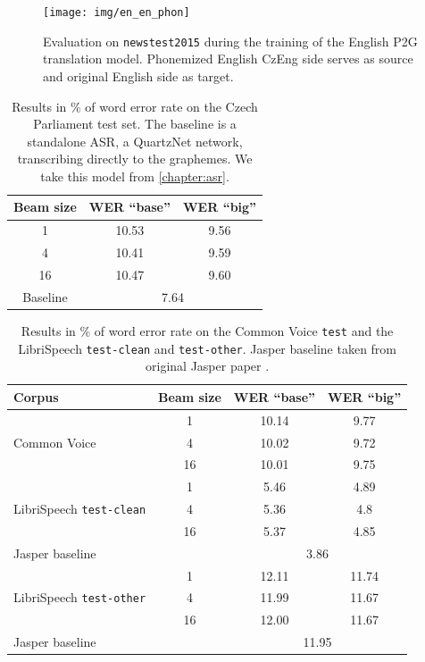 \begin{figure}[h]
	\texttt{[image: img/en\_en\_phon]}
	\caption{Evaluation on \texttt{newstest2015} during the training of the English P2G translation model. Phonemized English CzEng side serves as source and original English side as target.}
	\label{fig:en_en_phon}
\end{figure}




\begin{table}[h]
	\centering
	\begin{tabular}{c|cc}
		\bf Beam size & \bf WER ``base''& \bf WER ``big'' \\
		\hline
		1    &    10.53 & 9.56    \\
		4    &    10.41& 9.59    \\
		16    &    10.47& 9.60\\
		Baseline & \multicolumn{2}{c}{7.64} 
		
	\end{tabular}
	
	\caption{Results in \% of word error rate on the Czech Parliament test set. The baseline is a standalone ASR, a QuartzNet network, transcribing directly to the graphemes. We take this model from \cref{chapter:asr}.}
	\label{tab:phon_cs}
\end{table}


\begin{table}[H]
	\centering
	\begin{tabular}{lc|cc}
		\bf Corpus & \bf Beam size & \bf WER ``base''& \bf WER ``big'' \\
		\hline
		\multirow{3}{*}{Common Voice}    & 1    &10.14    &    9.77    \\
		& 4    & 10.02    &    9.72    \\
		& 16    &10.01    & 9.75    \\
		\hline
		
		\multirow{3}{*}{LibriSpeech \texttt{test-clean}}    & 1    &    5.46 &    4.89    \\
		& 4    &  5.36 &    4.8    \\
		& 16     &5.37    & 4.85    \\
		\multicolumn{2}{l|}{Jasper baseline} & \multicolumn{2}{c}{3.86} \\
		\hline
		
		\multirow{3}{*}{LibriSpeech \texttt{test-other}}    & 1    &    12.11 &11.74    \\
		& 4    & 11.99     &    11.67    \\
		& 16    & 12.00     & 11.67    \\
		\multicolumn{2}{l|}{Jasper baseline} & \multicolumn{2}{c}{11.95} \\
		
	\end{tabular}
	
	\caption{Results in \% of word error rate on the Common Voice \texttt{test} and the LibriSpeech \texttt{test-clean} and \texttt{test-other}. Jasper baseline taken from original Jasper paper .}
	\label{tab:phon_en}
\end{table}



